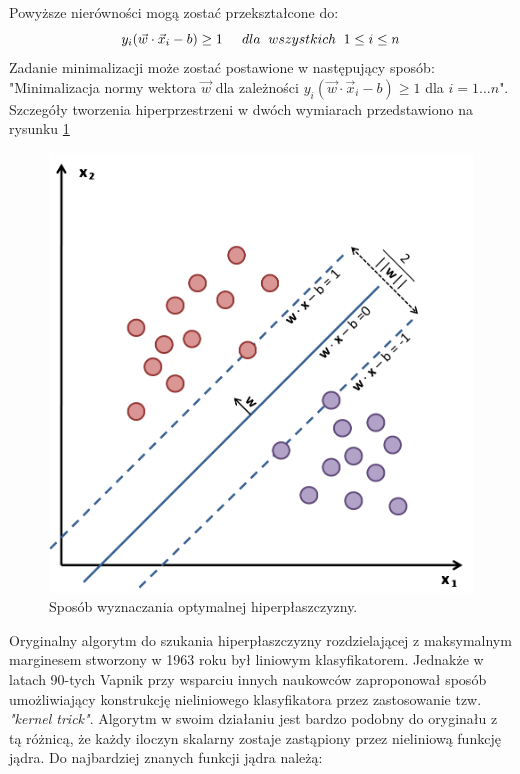 Powyższe nierówności mogą zostać przekształcone do:
\begin{equation}
y_i(\vec{w}\cdot \vec{x}_i - b) \geq 1 \hspace{0.5cm} dla \hspace{0.2cm} wszystkich \hspace{0.2cm} 1 \leq i \leq n
\end{equation}
Zadanie minimalizacji może zostać postawione w następujący sposób:
"Minimalizacja normy wektora $\vec{w}$ dla zależności $y_i(\vec{w}\cdot \vec{x}_i - b) \geq 1$ dla $i=1 \ldots n$".
Szczegóły tworzenia hiperprzestrzeni w dwóch wymiarach przedstawiono na rysunku \ref{im: SvmMargin}
\begin{figure}[h]
	\includegraphics[width=12cm]{SvmMargin}
	\centering
	\caption{Sposób wyznaczania optymalnej hiperpłaszczyzny.}
	\label{im: SvmMargin}
\end{figure}

Oryginalny algorytm do szukania hiperpłaszczyzny rozdzielającej z maksymalnym marginesem stworzony w 1963 roku był liniowym klasyfikatorem. Jednakże w latach 90-tych Vapnik przy wsparciu innych naukowców zaproponował sposób umożliwiający konstrukcję nieliniowego klasyfikatora przez zastosowanie tzw. \textit{"kernel trick"}. Algorytm w swoim działaniu jest bardzo podobny do oryginału z tą różnicą, że każdy iloczyn skalarny zostaje zastąpiony przez nieliniową funkcję jądra. Do najbardziej znanych funkcji jądra należą:

